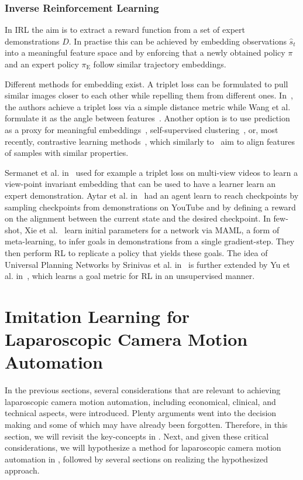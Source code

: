 \subsubsection{Inverse Reinforcement Learning}
In IRL the aim is to extract a reward function from a set of expert demonstrations $D$. In practise this can be achieved by embedding observations $\hat{s}_t$ into a meaningful feature space and by enforcing that a newly obtained policy $\pi$ and an expert policy $\pi_\text{E}$ follow similar trajectory embeddings.

Different methods for embedding exist. A triplet loss can be formulated to pull similar images closer to each other while repelling them from different ones. In~\cite{wang2014learning, schroff2015facenet}, the authors achieve a triplet loss via a simple distance metric while Wang et al. formulate it as the angle between features~\cite{wang2015unsupervised}. Another option is to use prediction as a proxy for meaningful embeddings~\cite{vondrick2016anticipating, sermanet2016unsupervised, srivastava2015unsupervised, mathieu2015deep}, self-supervised clustering~\cite{caron2018deep}, or, most recently, contrastive learning methods~\cite{khosla2020supervised}, which similarly to~\cite{wang2015unsupervised} aim to align features of samples with similar properties.

Sermanet et al. in~\cite{sermanet2018time} used for example a triplet loss on multi-view videos to learn a view-point invariant embedding that can be used to have a learner learn an expert demonstration. Aytar et al. in~\cite{aytar2018playing} had an agent learn to reach checkpoints by sampling checkpoints from demonstrations on YouTube and by defining a reward on the alignment between the current state and the desired checkpoint. In few-shot, Xie et al.~\cite{xie2018few} learn initial parameters for a network via MAML, a form of meta-learning, to infer goals in demonstrations from a single gradient-step. They then perform RL to replicate a policy that yields these goals. The idea of Universal Planning Networks by Srinivas et al. in~\cite{srinivas2018universal} is further extended by Yu et al. in~\cite{yu2019unsupervised}, which learns a goal metric for RL in an unsupervised manner.

\section[Imitation Learning for Robotic Laparoscopy]{Imitation Learning for Laparoscopic Camera Motion Automation}
\label{in:sec:imitation_learning_for_camera_motion_automation}
In the previous sections, several considerations that are relevant to achieving laparoscopic camera motion automation, including economical, clinical, and technical aspects, were introduced. Plenty arguments went into the decision making and some of which may have already been forgotten. Therefore, in this section, we will revisit the key-concepts in . Next, and given these critical considerations, we will hypothesize a method for laparoscopic camera motion automation in , followed by several sections on realizing the hypothesized approach.

